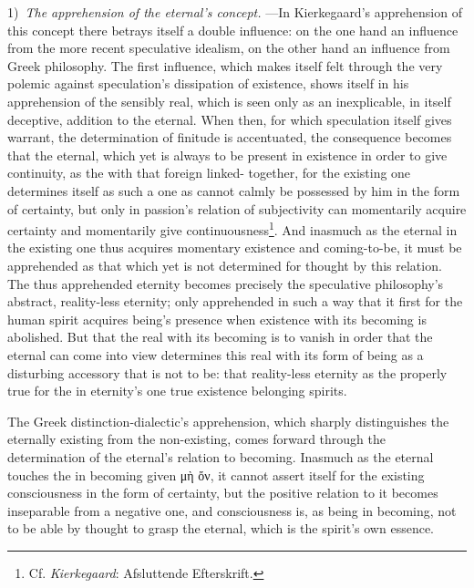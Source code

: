 \documentclass[12pt,a4paper]{book}
\begin{document}
1)~\emph{The apprehension of the eternal's concept.} ---In Kierkegaard's apprehension of this
concept there betrays itself a double influence: on the one hand an influence from the more recent
speculative idealism, on the other hand an influence from Greek philosophy. The first influence,
which makes itself felt through the very polemic against speculation's dissipation of existence,
shows itself in his apprehension of the sensibly real, which is seen only as an inexplicable, in
itself deceptive, addition to the eternal. When then, for which speculation itself gives warrant,
the determination of finitude is accentuated, the consequence becomes that the eternal, which yet
is always to be present in existence in order to give continuity, as the with that foreign linked-
together, for the existing one determines itself as such a one as cannot calmly be possessed by him
in the form of certainty, but only in passion's relation of subjectivity can momentarily acquire
certainty and momentarily give continuousness\footnote{Cf. \emph{Kierkegaard}: Afsluttende Efterskrift.}.
And inasmuch as the eternal in the existing one thus acquires momentary existence and coming-to-be,
it must be apprehended as that which yet is not determined for thought by this relation. The thus
apprehended eternity becomes precisely the speculative philosophy's abstract, reality-less eternity;
only apprehended in such a way that it first for the human spirit acquires being's presence when
existence with its becoming is abolished. But that the real with its becoming is to vanish in order
that the eternal can come into view determines this real with its form of being as a disturbing
accessory that is not to be: that reality-less eternity as the properly true for the in eternity's
one true existence belonging spirits.

The Greek distinction-dialectic's apprehension, which sharply distinguishes the eternally existing
from the non-existing, comes forward through the determination of the eternal's relation to becoming.
Inasmuch as the eternal touches the in becoming given μὴ ὄν, it cannot assert itself for the existing
consciousness in the form of certainty, but the positive relation to it becomes inseparable from a
negative one, and consciousness is, as being in becoming, not to be able by thought to grasp the
eternal, which is the spirit's own essence.
\end{document}
